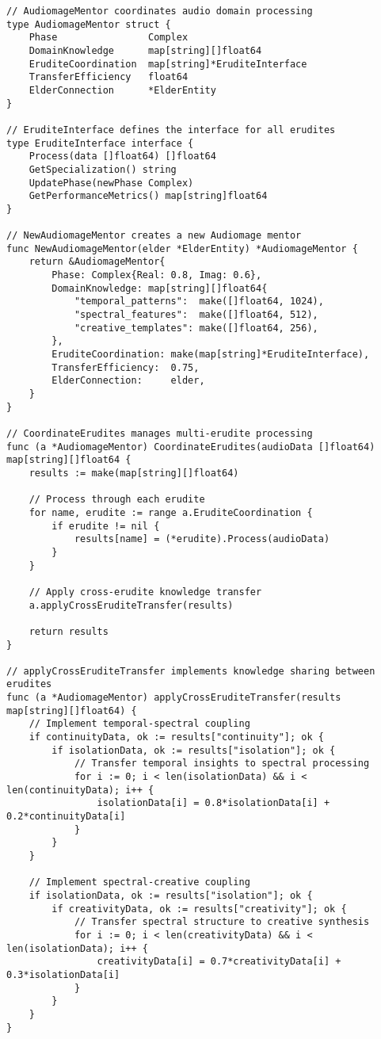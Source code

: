 \begin{tcolorbox}[colback=CodeBackground, colframe=DarkGray, title=Audiomage Mentor Implementation, fonttitle=\bfseries]
\begin{verbatim}
// AudiomageMentor coordinates audio domain processing
type AudiomageMentor struct {
    Phase                Complex
    DomainKnowledge      map[string][]float64
    EruditeCoordination  map[string]*EruditeInterface
    TransferEfficiency   float64
    ElderConnection      *ElderEntity
}

// EruditeInterface defines the interface for all erudites
type EruditeInterface interface {
    Process(data []float64) []float64
    GetSpecialization() string
    UpdatePhase(newPhase Complex)
    GetPerformanceMetrics() map[string]float64
}

// NewAudiomageMentor creates a new Audiomage mentor
func NewAudiomageMentor(elder *ElderEntity) *AudiomageMentor {
    return &AudiomageMentor{
        Phase: Complex{Real: 0.8, Imag: 0.6},
        DomainKnowledge: map[string][]float64{
            "temporal_patterns":  make([]float64, 1024),
            "spectral_features":  make([]float64, 512),
            "creative_templates": make([]float64, 256),
        },
        EruditeCoordination: make(map[string]*EruditeInterface),
        TransferEfficiency:  0.75,
        ElderConnection:     elder,
    }
}

// CoordinateErudites manages multi-erudite processing
func (a *AudiomageMentor) CoordinateErudites(audioData []float64) map[string][]float64 {
    results := make(map[string][]float64)
    
    // Process through each erudite
    for name, erudite := range a.EruditeCoordination {
        if erudite != nil {
            results[name] = (*erudite).Process(audioData)
        }
    }
    
    // Apply cross-erudite knowledge transfer
    a.applyCrossEruditeTransfer(results)
    
    return results
}

// applyCrossEruditeTransfer implements knowledge sharing between erudites
func (a *AudiomageMentor) applyCrossEruditeTransfer(results map[string][]float64) {
    // Implement temporal-spectral coupling
    if continuityData, ok := results["continuity"]; ok {
        if isolationData, ok := results["isolation"]; ok {
            // Transfer temporal insights to spectral processing
            for i := 0; i < len(isolationData) && i < len(continuityData); i++ {
                isolationData[i] = 0.8*isolationData[i] + 0.2*continuityData[i]
            }
        }
    }
    
    // Implement spectral-creative coupling
    if isolationData, ok := results["isolation"]; ok {
        if creativityData, ok := results["creativity"]; ok {
            // Transfer spectral structure to creative synthesis
            for i := 0; i < len(creativityData) && i < len(isolationData); i++ {
                creativityData[i] = 0.7*creativityData[i] + 0.3*isolationData[i]
            }
        }
    }
}
\end{verbatim}
\end{tcolorbox}


